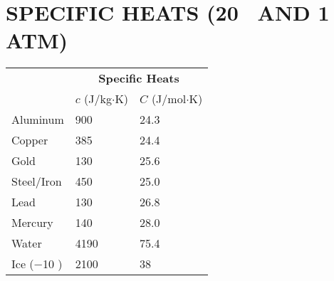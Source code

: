 \documentclass{article}
\begin{document}
\centering
\section*{SPECIFIC HEATS (20 \textcelsius\ AND 1 ATM)}
\begin{tabular}{@{\sf }lll@{}}
			\hline
			& \multicolumn{2}{c}{\bf Specific Heats} \\ 
			\cline{2-3}
			& $c$ (J/kg$\cdot$K) & $C$ (J/mol$\cdot$K) \\
			\hline
			Aluminum & 900 & 24.3 \\
			Copper & 385 & 24.4 \\
			Gold & 130 & 25.6 \\
			Steel/Iron & 450 & 25.0 \\
			Lead & 130 & 26.8 \\
			Mercury & 140 & 28.0 \\
			Water & 4190 & 75.4 \\
			Ice ($-$10 \textcelsius) & 2100 & 38 \\
			\hline
		\end{tabular}
		
\end{document}
